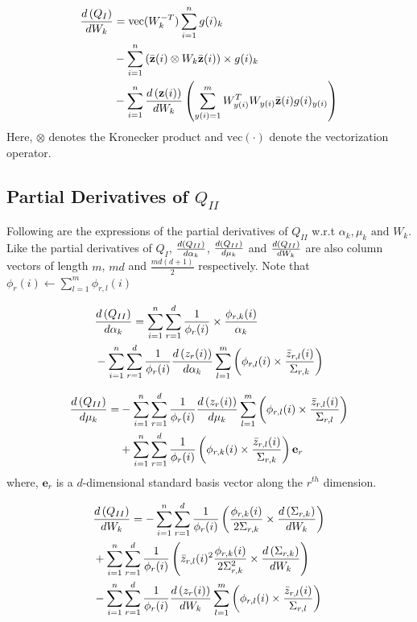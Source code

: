 \documentclass[]{article}
\begin{document}
\begin{align}\label{eq:der_QI_W}
\der{W_k}{Q_I} &= \text{vec}(W_k^{-T})\sum\limits_{i=1}^n g(i)_k \nonumber \\
&-\sum\limits_{i=1}^n  \left(\zbar{i} \otimes W_k \zbar{i}\right) \times g(i)_k \nonumber \\  
&-\sum\limits_{i=1}^n \der{W_k}{\textbf{z}(i)} \left( \sum\limits_{y(i)=1}^m W_{y(i)}^T  W_{y(i)} \zbar{i}g(i)_{y(i)} \right)
\end{align}
Here, $\otimes$ denotes the Kronecker product and $\text{vec}(\cdot )$ denote the vectorization operator.

\subsection{Partial Derivatives of $Q_{II}$} \label{subsec:QII_partial_deriv}
 Following are the expressions of the partial derivatives of $Q_{II}$ w.r.t ${\alpha_k,\mu_k \text{ and } W_k}$. Like the partial derivatives of $Q_I$, $\der{\alpha_k}{Q_{II}}$, $\der{\mu_k}{Q_{II}}$ and $\der{W_k}{Q_{II}}$ are also column vectors of length $m$, $md$ and $\frac{md(d+1)}{2}$ respectively. Note that $\phi_r(i) \leftarrow \sum\limits_{l=1}^{m}\phi_{r,l}(i)$

\begin{align}\label{eq:der_QII_alpha}
&\der{\alpha_k}{Q_{II}} = \sum\limits_{i=1}^n \sum\limits_{r=1}^{d} \frac{1}{\phi_r(i)} \times \frac{\phi_{r,k}(i)}{\alpha_k} \nonumber \\ 
&- \sum\limits_{i=1}^n \sum\limits_{r=1}^{d}\frac{1}{\phi_r(i)} \der{\alpha_k}{z_r(i)} \sum\limits_{l=1}^{m} \left( \phi_{r,l}(i) \times \frac{\bar{z}_{r,l}(i)}{\Sigma_{r,k}} \right)
\end{align}

\begin{align}\label{eq:der_QII_mu}
\der{\mu_k}{Q_{II}} =& -\sum\limits_{i=1}^n \sum\limits_{r=1}^{d}\frac{1}{\phi_r(i)} \der{\mu_k}{z_r(i)}\sum\limits_{l=1}^{m} \left( \phi_{r,l}(i) \times \frac{\bar{z}_{r,l}(i)}{\Sigma_{r,l}} \right) \nonumber \\ 
& + \sum\limits_{i=1}^n \sum\limits_{r=1}^{d}\frac{1}{\phi_r(i)}  \left( \phi_{r,k}(i) \times \frac{\bar{z}_{r,l}(i)}{\Sigma_{r,k}} \right) \textbf{e}_r 
\end{align}
where, $\textbf{e}_r$ is a $d$-dimensional standard basis vector along the $r^{th}$ dimension.

\begin{align}\label{eq:der_QII_W}
&\der{W_k}{Q_{II}} = -\sum\limits_{i=1}^n \sum\limits_{r=1}^{d}\frac{1}{\phi_r(i)} \left( \frac{\phi_{r,k}(i)}{2\Sigma_{r,k}} \times  \der{W_k}{\Sigma_{r,k}}  \right) \nonumber \\ 
&+ \sum\limits_{i=1}^n \sum\limits_{r=1}^{d}\frac{1}{\phi_r(i)} \left( \bar{z}_{r,l}(i)^2\frac{\phi_{r,k}(i)}{2\Sigma_{r,k}^2}\times \der{W_k}{\Sigma_{r,k}}\right) \nonumber \\ 
&-\sum\limits_{i=1}^n \sum\limits_{r=1}^{d}\frac{1}{\phi_r(i)}\der{W_k}{z_r(i)} \sum\limits_{l=1}^{m} \left( \phi_{r,l}(i) \times \frac{\bar{z}_{r,l}(i)}{\Sigma_{r,l}} \right)
\end{align}
\end{document}
